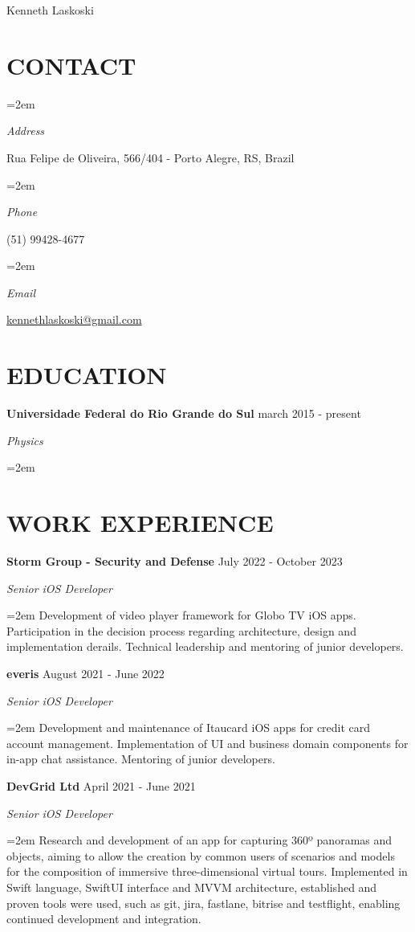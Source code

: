 \documentclass[paper=a4,fontsize=11pt]{scrartcl} %
\newlength{\spacebox}
\newcommand{\sepspace}{\vspace*{1em}}		%
\newcommand{\MyName}[1]{ %
		\Huge \usefont{OT1}{phv}{b}{n} \hfill #1
		\par \normalsize \normalfont}
\newcommand{\MySlogan}[1]{ %
		\large \usefont{OT1}{phv}{m}{n}\hfill \textit{#1}
		\par \normalsize \normalfont}
\newcommand{\NewPart}[1]{\section*{\uppercase{#1}}}
\newcommand{\PersonalEntry}[2]{
		\noindent\hangindent=2em\hangafter=0 %
		\parbox{\spacebox}{        %
		\textit{#1}}		       %
		\hspace{1.5em} #2 \par}    %
\newcommand{\EducationEntry}[4]{
		\noindent \textbf{#1} \hfill      %
        #2 \par
		\noindent \textit{#3} \par        %
		\noindent\hangindent=2em\hangafter=0 \small #4 %
		\normalsize \par}
\newcommand{\WorkEntry}[4]{				  %
		\noindent \textbf{#1} \hfill      %
        #2 \par
		\noindent \textit{#3} \par        %
		\noindent\hangindent=2em\hangafter=0 \small #4 %
		\normalsize \par}
\begin{document}

\MyName{Kenneth Laskoski}

\sepspace

\NewPart{Contact}{}

\PersonalEntry{Address}{Rua Felipe de Oliveira, 566/404 - Porto Alegre, RS, Brazil}
\PersonalEntry{Phone}{(51) 99428-4677}
\PersonalEntry{Email}{\url{kennethlaskoski@gmail.com}}

\NewPart{Education}{}

\EducationEntry{Universidade Federal do Rio Grande do Sul}{march 2015 - present}{Physics}{}
\sepspace

\NewPart{Work Experience}{}

\WorkEntry
  {Storm Group - Security and Defense}
  {July 2022 - October 2023}
  {Senior iOS Developer}
  {Development of video player framework for Globo TV iOS apps. Participation in the decision process regarding architecture, design and implementation derails. Technical leadership and mentoring of junior developers.}

\sepspace
\sepspace

\WorkEntry
  {everis}
  {August 2021 - June 2022}
  {Senior iOS Developer}
  {Development and maintenance of Itaucard iOS apps for credit card account management. Implementation of UI and business domain components for in-app chat assistance. Mentoring of junior developers.}

\sepspace
\sepspace

\WorkEntry
  {DevGrid Ltd}
  {April 2021 - June 2021}
  {Senior iOS Developer}
  {Research and development of an app for capturing 360º panoramas and objects, aiming to allow the creation by common users of scenarios and models for the composition of immersive three-dimensional virtual tours. Implemented in Swift language, SwiftUI interface and MVVM architecture, established and proven tools were used, such as git, jira, fastlane, bitrise and testflight, enabling continued development and integration.}
\end{document}
